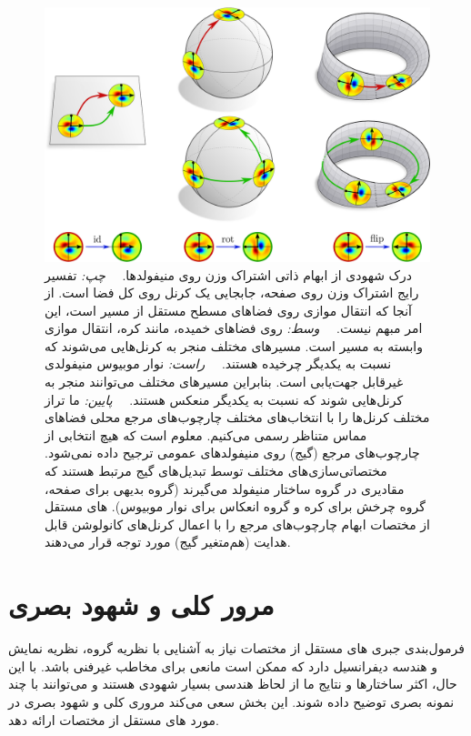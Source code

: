 

\newpage


\begin{figure}
	\centering
	\includegraphics[width=.93\columnwidth]{figures/intro_transport_ambiguity.pdf}
	\caption{\small
		درک شهودی از ابهام ذاتی اشتراک وزن روی منیفولدها.
		\ \ \emph{چپ:}
		تفسیر رایج اشتراک وزن روی صفحه، جابجایی یک کرنل روی کل فضا است.
		از آنجا که انتقال موازی روی فضاهای مسطح مستقل از مسیر است، این امر مبهم نیست.
		\ \ \emph{وسط:}
		روی فضاهای خمیده، مانند کره، انتقال موازی وابسته به مسیر است.
		مسیرهای مختلف منجر به کرنل‌هایی می‌شوند که نسبت به یکدیگر چرخیده هستند.
		\ \ \emph{راست:}
		نوار موبیوس منیفولدی غیرقابل جهت‌یابی است.
		بنابراین مسیرهای مختلف می‌توانند منجر به کرنل‌هایی شوند که نسبت به یکدیگر منعکس هستند.
		\ \ \emph{پایین:}
		ما تراز مختلف کرنل‌ها را با انتخاب‌های مختلف چارچوب‌های مرجع محلی فضاهای مماس متناظر رسمی می‌کنیم.
		معلوم است که هیچ انتخابی از چارچوب‌های مرجع (گیج) روی منیفولدهای عمومی ترجیح داده نمی‌شود.
		مختصاتی‌سازی‌های مختلف توسط تبدیل‌های گیج مرتبط هستند که مقادیری در گروه ساختار  منیفولد می‌گیرند (گروه بدیهی  برای صفحه، گروه چرخش  برای کره و گروه انعکاس  برای نوار موبیوس).
		های مستقل از مختصات ابهام چارچوب‌های مرجع را با اعمال کرنل‌های کانولوشن قابل هدایت  (هم‌متغیر گیج) مورد توجه قرار می‌دهند.
	}
	\label{fig:weight_sharing_ambiguity}
\end{figure}


\section{مرور کلی و شهود بصری}
\label{sec:visual_intro}


فرمول‌بندی جبری های مستقل از مختصات نیاز به آشنایی با نظریه گروه، نظریه نمایش و هندسه دیفرانسیل دارد که ممکن است مانعی برای مخاطب غیرفنی باشد.
با این حال، اکثر ساختارها و نتایج ما از لحاظ هندسی بسیار شهودی هستند و می‌توانند با چند نمونه بصری توضیح داده شوند.
این بخش سعی می‌کند مروری کلی و شهود بصری در مورد های مستقل از مختصات ارائه دهد.

